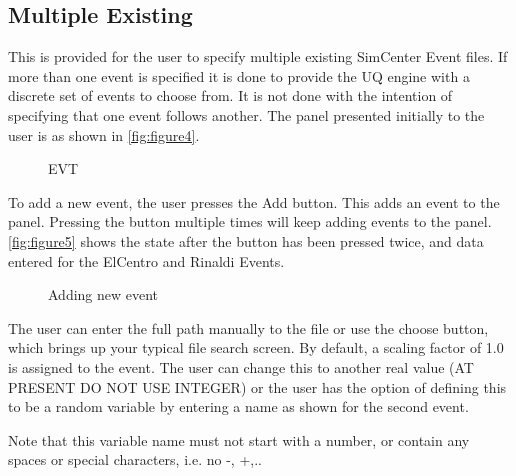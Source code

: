 \subsection{Multiple Existing}

This is provided for the user to specify multiple existing SimCenter
Event files.  If more than one event is specified it is done to provide
the UQ engine with a discrete set of events to choose from.  It is not
done with the intention of specifying that one event follows another.
The panel presented initially to the user is as shown
in \autoref{fig:figure4}.

\begin{figure}[!htbp]
  \caption{EVT}
  \label{fig:figure4}
\end{figure}

To add a new event, the user presses the Add button.  This adds an event to the panel.  Pressing the button multiple times will keep adding events to the panel.  \autoref{fig:figure5} shows the state after the button has been pressed twice, and data entered for the ElCentro and Rinaldi Events.

\begin{figure}[!htbp]
  \caption{Adding new event}
  \label{fig:figure5}
\end{figure}


The user can enter the full path manually to the file or use the choose button,  which brings up your typical file search screen.  By default, a scaling factor of 1.0 is assigned to the event. 
The user can change this to another real value (AT PRESENT DO NOT USE INTEGER) or the user 
has the option of defining this to be a random variable by entering a name as shown for the second event. 

Note that this variable name must not start with a number, or contain any spaces or special characters, i.e. no -, +,..

